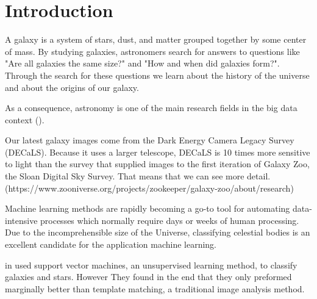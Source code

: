 \section{Introduction}


A galaxy is a system of stars, dust, and matter grouped together by some center of mass. By studying galaxies, astronomers search for answers to questions like "Are all galaxies the same size?" and "How and when did galaxies form?". Through the search for these questions we learn about the history of the universe and about the origins of our galaxy.


As a consequence, astronomy is one of the main research fields in the big data context (\citeauthor{microsoft-galaxies}).


Our latest galaxy images come from the Dark Energy Camera Legacy Survey (DECaLS). Because it uses a larger telescope, DECaLS is 10 times more sensitive to light than the survey that supplied images to the first iteration of Galaxy Zoo, the Sloan Digital Sky Survey. That means that we can see more detail. (https://www.zooniverse.org/projects/zookeeper/galaxy-zoo/about/research)


Machine learning methods are rapidly becoming a go-to tool for automating data-intensive processes which normally require days or weeks of human processing. Due to the incomprehensible size of the Universe, classifying celestial bodies is an excellent candidate for the application machine learning.



\citeauthor{svn-galaxy} in \citeyear{svn-galaxy} used support vector machines, an unsupervised learning method, to classify galaxies and stars. However They found in the end that they only preformed marginally better than template matching, a traditional image analysis method. \cite{svn-galaxy}


